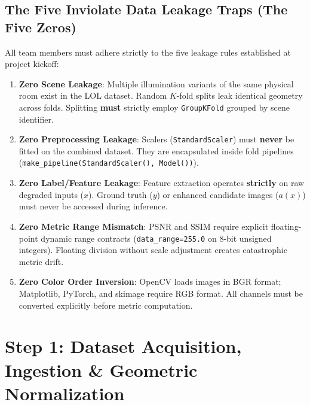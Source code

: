 \documentclass[10pt,a4paper]{article}
\begin{document}
\subsection{The Five Inviolate Data Leakage Traps (The Five Zeros)}
All team members must adhere strictly to the five leakage rules established at project kickoff:
\begin{enumerate}[leftmargin=*, nosep]
    \item \textbf{Zero Scene Leakage}: Multiple illumination variants of the same physical room exist in the LOL dataset. Random $K$-fold splits leak identical geometry across folds. Splitting \textbf{must} strictly employ \texttt{GroupKFold} grouped by scene identifier.
    \item \textbf{Zero Preprocessing Leakage}: Scalers (\texttt{StandardScaler}) must \textbf{never} be fitted on the combined dataset. They are encapsulated inside fold pipelines (\texttt{make\_pipeline(StandardScaler(), Model())}).
    \item \textbf{Zero Label/Feature Leakage}: Feature extraction operates \textbf{strictly} on raw degraded inputs ($x$). Ground truth ($y$) or enhanced candidate images ($a(x)$) must never be accessed during inference.
    \item \textbf{Zero Metric Range Mismatch}: PSNR and SSIM require explicit floating-point dynamic range contracts (\texttt{data\_range=255.0} on 8-bit unsigned integers). Floating division without scale adjustment creates catastrophic metric drift.
    \item \textbf{Zero Color Order Inversion}: OpenCV loads images in BGR format; Matplotlib, PyTorch, and skimage require RGB format. All channels must be converted explicitly before metric computation.
\end{enumerate}

\section{Step 1: Dataset Acquisition, Ingestion \& Geometric Normalization}
\end{document}

